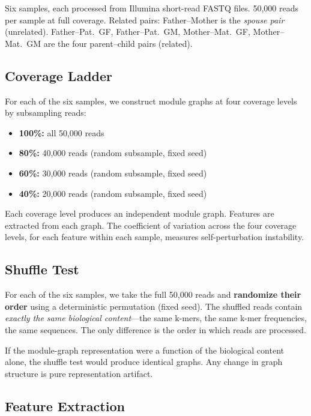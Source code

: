 \documentclass{../yalumba}
\begin{document}
Six samples, each processed from Illumina short-read FASTQ files.
50,000 reads per sample at full coverage.  Related pairs: Father--Mother
is the \emph{spouse pair} (unrelated).  Father--Pat.~GF, Father--Pat.~GM,
Mother--Mat.~GF, Mother--Mat.~GM are the four parent--child pairs
(related).

\subsection{Coverage Ladder}
\label{sec:coverage-ladder}

For each of the six samples, we construct module graphs at four coverage
levels by subsampling reads:

\begin{itemize}
  \item \textbf{100\%:} all 50,000 reads
  \item \textbf{80\%:} 40,000 reads (random subsample, fixed seed)
  \item \textbf{60\%:} 30,000 reads (random subsample, fixed seed)
  \item \textbf{40\%:} 20,000 reads (random subsample, fixed seed)
\end{itemize}

Each coverage level produces an independent module graph.  Features are
extracted from each graph.  The coefficient of variation across the four
coverage levels, for each feature within each sample, measures
self-perturbation instability.

\subsection{Shuffle Test}
\label{sec:shuffle-test}

For each of the six samples, we take the full 50,000 reads and
\textbf{randomize their order} using a deterministic permutation (fixed
seed).  The shuffled reads contain \emph{exactly the same biological
content}---the same k-mers, the same k-mer frequencies, the same
sequences.  The only difference is the order in which reads are
processed.

If the module-graph representation were a function of the biological
content alone, the shuffle test would produce identical graphs.  Any
change in graph structure is pure representation artifact.

\subsection{Feature Extraction}
\end{document}

